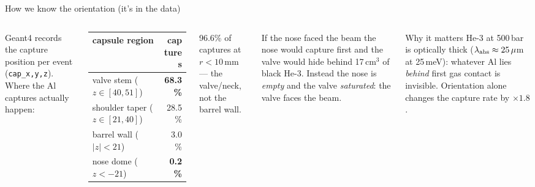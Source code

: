 \documentclass[aspectratio=169,11pt]{beamer}
\begin{document}
\begin{frame}{How we know the orientation (it's in the data)}
  \begin{columns}[T]
    \small
    Geant4 records the capture position per event
    (\texttt{cap\_x,y,z}). Where the Al captures actually happen:
    \medskip

    \begin{tabular}{lr}
      \toprule
      capsule region & captures \\
      \midrule
      valve stem ($z\!\in\![40,51]$) & \textbf{68.3\%} \\
      shoulder taper ($z\!\in\![21,40]$) & 28.5\% \\
      barrel wall ($|z|<21$) & 3.0\% \\
      nose dome ($z<-21$) & \textbf{0.2\%} \\
      \bottomrule
    \end{tabular}
    \medskip

    96.6\% of captures at $r<10$\,mm --- the valve/neck, not the barrel wall.
    \small
    \begin{alertblock}{\small If the nose faced the beam}
      the nose would capture first and the valve would hide behind
      17\,cm$^{3}$ of black He-3. Instead the nose is \emph{empty} and the
      valve \emph{saturated}: the valve faces the beam.
    \end{alertblock}
    \smallskip
    \begin{block}{\small Why it matters}
      He-3 at 500\,bar is optically thick ($\lambda_{\rm abs}\approx25\,\mu$m
      at 25\,meV): whatever Al lies \emph{behind} first gas contact is
      invisible. Orientation alone changes the capture rate by
      $\times 1.8$.
    \end{block}
  \end{columns}
\end{frame}
\end{document}
